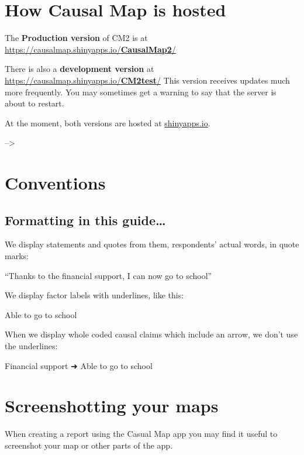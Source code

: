 \documentclass[
]{book}
\begin{document}
\hypertarget{how-causal-map-is-hosted}{%
\chapter{How Causal Map is hosted}\label{how-causal-map-is-hosted}}

The \textbf{Production version} of CM2 is at \href{https://causalmap.shinyapps.io/CausalMap2/}{https://causalmap.shinyapps.io/\textbf{CausalMap2}/}

There is also a \textbf{development version} at \href{https://causalmap.shinyapps.io/CM2test/}{https://causalmap.shinyapps.io/\textbf{CM2test}/} This version receives updates much more frequently. You may sometimes get a warning to say that the server is about to restart.

At the moment, both versions are hosted at \href{http://shinyapps.io}{shinyapps.io}.

--\textgreater{}

\hypertarget{xconventions}{%
\chapter{Conventions}\label{xconventions}}

\hypertarget{formatting-in-this-guide}{%
\section{Formatting in this guide\ldots{}}\label{formatting-in-this-guide}}

We display statements and quotes from them, respondents' actual words, in quote marks:

``Thanks to the financial support, I can now go to school''

We display factor labels with underlines, like this:

Able to go to school

When we display whole coded causal claims which include an arrow, we don't use the underlines:

Financial support ➜ Able to go to school

\hypertarget{screenshotting-your-maps}{%
\chapter{Screenshotting your maps}\label{screenshotting-your-maps}}

When creating a report using the Casual Map app you may find it useful to screenshot your map or other parts of the app.
\end{document}
